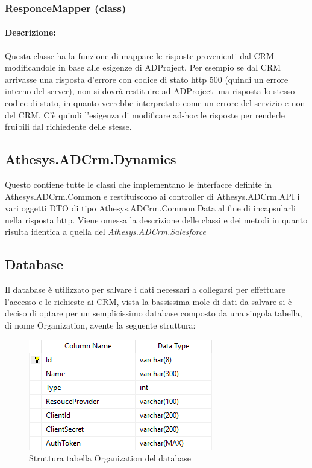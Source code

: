 \subsubsection{ResponceMapper (class)}\label{responceMapperClass}
\paragraph{Descrizione:}
Questa classe ha la funzione di mappare le risposte provenienti dal CRM modificandole in base alle esigenze di ADProject.
Per esempio se dal CRM arrivasse una risposta d'errore con codice di stato http 500 (quindi un errore interno del server), non si dovrà restituire ad ADProject una risposta lo stesso codice di stato, in quanto verrebbe interpretato come un errore del servizio e non del CRM. C'è quindi l'esigenza di modificare ad-hoc le risposte per renderle fruibili dal richiedente delle stesse.

\subsection{Athesys.ADCrm.Dynamics}\label{dynamics}
Questo  contiene tutte le classi che implementano le interfacce definite in Athesys.ADCrm.Common e restituiscono ai controller di Athesys.ADCrm.API i vari oggetti DTO di tipo Athesys.ADCrm.Common.Data al fine di incapsularli nella risposta http.
Viene omessa la descrizione delle classi e dei metodi in quanto risulta identica a quella del  \textit{Athesys.ADCrm.Salesforce}

\subsection{Database}
Il database è utilizzato per salvare i dati necessari a collegarsi per effettuare l'accesso e le richieste ai CRM, vista la bassissima mole di dati da salvare si è deciso di optare per un semplicissimo database  composto da una singola tabella, di nome Organization, avente la seguente struttura:
\begin{figure}[H]
	\centering
	\includegraphics[width=0.7\linewidth]{images/schemaDB}
	\caption{Struttura tabella Organization del database}
	\label{fig:schemadb}
\end{figure}

